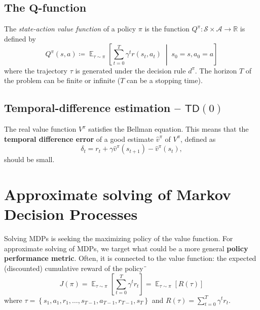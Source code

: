 \documentclass[12pt]{report}
\newcommand\RR{\mathbb{R}}
\newcommand{\scalemid}{\;\middle|\;}
\DeclareMathOperator{\EE}{\mathbb{E}}
\newcommand{\calA}{\mathcal{A}}
\newcommand{\calS}{\mathcal{S}}
\newcommand{\bluefont}{\color{Blue}}
\begin{document}
\section{The $\boldsymbol{Q}$-function}



\begin{defn}
	The \textit{state-action value function} of a policy $\pi$ is the function $Q^\pi\colon \calS\times\calA\to \RR$ is defined by
	\begin{equation}
	Q^\pi(s, a) \coloneqq \EE_{\tau\sim \pi}
	\left[
	\sum_{t=0}^T \gamma^t r(s_t, a_t) \scalemid s_0 = s, a_0 = a
	\right]
	\end{equation}
	where the trajectory $\tau$ is generated under the decision rule $d^\pi$.
	The horizon $T$ of the problem can be finite or infinite ($T$ can be a stopping time).
\end{defn}


\section{Temporal-difference estimation -- $\mathsf{TD}(0)$}

The real value function $V^\pi$ satisfies the Bellman equation. This means that the \textbf{\bluefont temporal difference error} of a good estimate $\hat{v}^\pi$ of $V^\pi$, defined as
\[
	\delta_t = r_t + \gamma \hat{v}^\pi(s_{t+1}) - \hat{v}^\pi(s_t),
\]
should be small.






\chapter{Approximate solving of Markov Decision Processes}


Solving MDPs is seeking the maximizing policy of the value function. For approximate solving of MDPs, we target what could be a more general \textbf{\bluefont policy performance metric}. Often, it is connected to the value function: the expected (discounted) cumulative reward of the policy¨
\begin{equation}\label{eq:PolicyPerfCumReward}
J(\pi) = \EE_{\tau\sim\pi}\left[
	\sum_{t=0}^{T} \gamma^t r_t
\right] =
	\EE_{\tau\sim\pi}
	\left[R(\tau)\right]
\end{equation}
where $\tau = \left\{ s_1,a_1,r_1,\ldots,s_{T-1},a_{T-1},r_{T-1},s_{T}\right\}$ and $R(\tau) = \sum_{t=0}^T \gamma^t r_t$.
\end{document}
